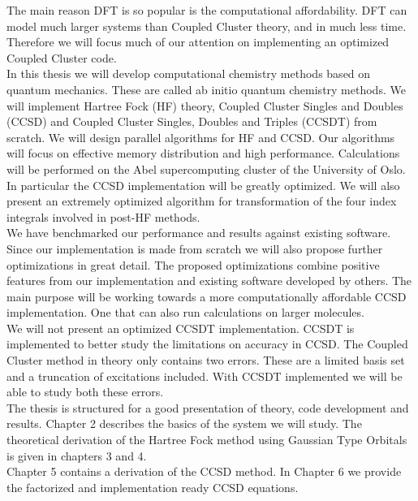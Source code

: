 \documentclass[a4paper,norsk,11pt,twoside]{report}
\begin{document}
The main reason DFT is so popular is the computational
affordability. DFT can model much larger systems than Coupled Cluster theory,
and in much less time. Therefore we will focus much of our attention
on implementing an optimized Coupled Cluster code. \\

In this thesis we will develop computational chemistry methods based
on quantum mechanics. These are called ab initio quantum chemistry
methods. We will implement Hartree Fock (HF) theory, Coupled Cluster Singles
and Doubles (CCSD) and Coupled Cluster Singles, Doubles and Triples
(CCSDT) from scratch. We will design parallel algorithms for HF and
CCSD. Our algorithms will focus on effective memory distribution and
high performance. Calculations will be performed on the Abel supercomputing
cluster of the University of Oslo. In particular the CCSD implementation will be greatly
optimized. We will also present an extremely optimized algorithm for
transformation of the four index integrals involved in post-HF
methods. \\

We have benchmarked our performance and results against existing
software. Since our implementation is made from scratch we will also
propose further optimizations in great detail. The proposed
optimizations combine positive features from our implementation and
existing software developed by others. The main purpose will be
working towards a more computationally affordable CCSD
implementation. One that can also run calculations on larger
molecules. \\

We will not present an optimized CCSDT implementation. CCSDT is
implemented to better study the limitations on accuracy in
CCSD. The Coupled Cluster method in theory only contains two errors. These are a
limited basis set and a truncation of excitations included. With CCSDT
implemented we will be able to study both these errors. \\

The thesis is structured for a good presentation of theory, code
development and results. Chapter 2 describes the basics of the system
we will study. The theoretical derivation of the Hartree Fock method
using Gaussian Type Orbitals is given in chapters 3 and 4. \\

Chapter 5 contains a derivation of the CCSD method. In Chapter 6 we provide
the factorized and implementation ready CCSD equations. \\
\end{document}

